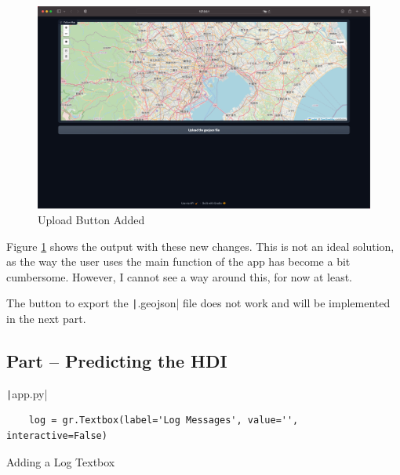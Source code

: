 \documentclass[12pt]{report}
\newcommand{\pil}[1]{\protect\texttt|#1|}
\begin{document}
\begin{figure}[H]
\centering
\includegraphics[width=14cm]{ss11.6.png}
\caption{Upload Button Added}\label{fig:ss11.6}
\end{figure}

Figure \ref{fig:ss11.6} shows the output with these new changes. This is not an ideal solution, as the way the user uses the main function of the app has become a bit cumbersome. However, I cannot see a way around this, for now at least.

\begin{center}
\end{center}

The button to export the \pil{.geojson} file does not work and will be implemented in the next part.

\subsection{Part \theparts{} -- Predicting the HDI}

\begin{listing}[H]
\pil{app.py}
\begin{verbatim}
    log = gr.Textbox(label='Log Messages', value='', interactive=False)
\end{verbatim}
\caption{Adding a Log Textbox}\label{cs:logTextbox}
\end{listing}
\end{document}
